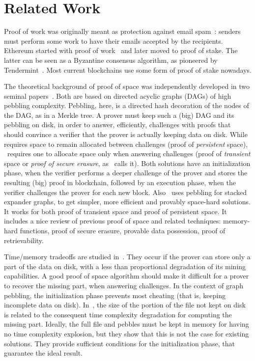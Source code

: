 \section{Related Work}\label{sec:related_work}

Proof of work was originally meant as protection against email spam~\cite{DworkN92}:
senders must perform some work to have their emails accepted by the recipients.
Ethereum started with proof of work~\cite{AntonopoulosW18} and later
moved to proof of stake. The latter can be seen as a
Byzantine consensus algorithm, as pioneered by Tendermint~\cite{Kwon14}.
Most current blockchains use some form of proof of stake nowadays.

The theoretical background of proof of space was independently developed
in two seminal papers~\cite{AtenieseBFG14,DziembowskiFKP15}.
Both are based on directed acyclic graphs (DAGs) of high pebbling complexity.
Pebbling, here, is a directed hash decoration of the nodes of the DAG, as in a Merkle tree.
A prover must keep such a (big) DAG and its pebbling on disk, in order to answer, efficiently,
challenges with proofs that should convince a verifier that
the prover is actually keeping data on disk.
While~\cite{DziembowskiFKP15} requires space to remain allocated between challenges
(proof of \emph{persistent} space), \cite{AtenieseBFG14}~requires one
to allocate space only when answering challenges
(proof of \emph{transient} space or \emph{proof of secure erasure}, as~\cite{DziembowskiFKP15} calls it).
Both solutions have an initialization phase, when the verifier performs a deeper challenge
of the prover and stores the resulting (big) proof in blockchain, followed by an execution phase,
when the verifier challenges the prover for each new block. Also~\cite{RenD16} uses
pebbling for stacked expander graphs, to get simpler, more efficient and
provably space-hard solutions.
It works for both proof of transient space and proof of persistent space.
It includes a nice review of previous proof of space
and related techniques: memory-hard functions, proof of secure erasure, provable data possession,
proof of retrievability.

Time/memory tradeoffs are studied in~\cite{Reyzin23}. They occur if
the prover can store only a part of the data on disk, with a less than proportional
degradation of its mining capabilities.
A good proof of space algorithm should make it difficult for a prover to recover the
missing part, when answering challenges.
In the context of graph pebbling, the initialization phase prevents most cheating
(that is, keeping incomplete data on disk). In~\cite{Reyzin23}, the size
of the portion of the file not kept on disk is related to the consequent time
complexity degradation for computing the missing part.
Ideally, the full file and pebbles must be kept in memory
for having no time complexity explosion, but they show
that this is not the case for existing solutions.
They provide sufficient conditions for the initialization phase, that guarantee the ideal result.

